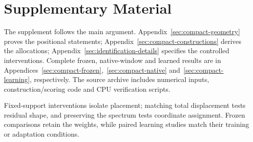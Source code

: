 \section*{Supplementary Material}
The supplement follows the main argument. Appendix~\ref{sec:compact-geometry}
proves the positional statements; Appendix~\ref{sec:compact-constructions}
derives the allocations; Appendix~\ref{sec:identification-details} specifies
the controlled interventions. Complete frozen, native-window and learned
results are in Appendices~\ref{sec:compact-frozen},~\ref{sec:compact-native}
and~\ref{sec:compact-learning}, respectively. The source archive includes
numerical inputs, construction/scoring code and CPU verification scripts.

Fixed-support interventions isolate placement; matching total displacement
tests residual shape, and preserving the spectrum tests coordinate assignment.
Frozen comparisons retain the weights, while paired learning studies match
their training or adaptation conditions.

